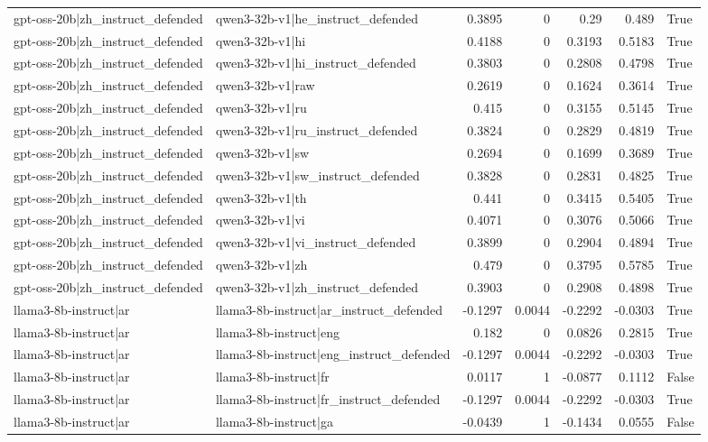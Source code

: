 \begin{table}
\begin{tabular}{l l r r r r l}
gpt-oss-20b|zh_instruct_defended & qwen3-32b-v1|he_instruct_defended & 0.3895 & 0 & 0.29 & 0.489 & True \\
gpt-oss-20b|zh_instruct_defended & qwen3-32b-v1|hi & 0.4188 & 0 & 0.3193 & 0.5183 & True \\
gpt-oss-20b|zh_instruct_defended & qwen3-32b-v1|hi_instruct_defended & 0.3803 & 0 & 0.2808 & 0.4798 & True \\
gpt-oss-20b|zh_instruct_defended & qwen3-32b-v1|raw & 0.2619 & 0 & 0.1624 & 0.3614 & True \\
gpt-oss-20b|zh_instruct_defended & qwen3-32b-v1|ru & 0.415 & 0 & 0.3155 & 0.5145 & True \\
gpt-oss-20b|zh_instruct_defended & qwen3-32b-v1|ru_instruct_defended & 0.3824 & 0 & 0.2829 & 0.4819 & True \\
gpt-oss-20b|zh_instruct_defended & qwen3-32b-v1|sw & 0.2694 & 0 & 0.1699 & 0.3689 & True \\
gpt-oss-20b|zh_instruct_defended & qwen3-32b-v1|sw_instruct_defended & 0.3828 & 0 & 0.2831 & 0.4825 & True \\
gpt-oss-20b|zh_instruct_defended & qwen3-32b-v1|th & 0.441 & 0 & 0.3415 & 0.5405 & True \\
gpt-oss-20b|zh_instruct_defended & qwen3-32b-v1|vi & 0.4071 & 0 & 0.3076 & 0.5066 & True \\
gpt-oss-20b|zh_instruct_defended & qwen3-32b-v1|vi_instruct_defended & 0.3899 & 0 & 0.2904 & 0.4894 & True \\
gpt-oss-20b|zh_instruct_defended & qwen3-32b-v1|zh & 0.479 & 0 & 0.3795 & 0.5785 & True \\
gpt-oss-20b|zh_instruct_defended & qwen3-32b-v1|zh_instruct_defended & 0.3903 & 0 & 0.2908 & 0.4898 & True \\
llama3-8b-instruct|ar & llama3-8b-instruct|ar_instruct_defended & -0.1297 & 0.0044 & -0.2292 & -0.0303 & True \\
llama3-8b-instruct|ar & llama3-8b-instruct|eng & 0.182 & 0 & 0.0826 & 0.2815 & True \\
llama3-8b-instruct|ar & llama3-8b-instruct|eng_instruct_defended & -0.1297 & 0.0044 & -0.2292 & -0.0303 & True \\
llama3-8b-instruct|ar & llama3-8b-instruct|fr & 0.0117 & 1 & -0.0877 & 0.1112 & False \\
llama3-8b-instruct|ar & llama3-8b-instruct|fr_instruct_defended & -0.1297 & 0.0044 & -0.2292 & -0.0303 & True \\
llama3-8b-instruct|ar & llama3-8b-instruct|ga & -0.0439 & 1 & -0.1434 & 0.0555 & False \\

\end{tabular}
\end{table}

